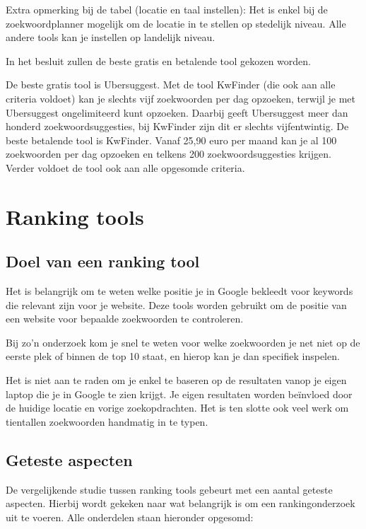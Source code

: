 Extra opmerking bij de tabel (locatie en taal instellen): Het is enkel bij de zoekwoordplanner mogelijk om de locatie in te stellen op stedelijk niveau. Alle andere tools kan je instellen op landelijk niveau. 

In het besluit zullen de beste gratis en betalende tool gekozen worden.

De beste gratis tool is Ubersuggest. Met de tool KwFinder (die ook aan alle criteria voldoet) kan je slechts vijf zoekwoorden per dag opzoeken, terwijl je met Ubersuggest ongelimiteerd kunt opzoeken. Daarbij geeft Ubersuggest meer dan honderd zoekwoordsuggesties, bij KwFinder zijn dit er slechts vijfentwintig. 
De beste betalende tool is KwFinder. Vanaf 25,90 euro per maand kan je al 100 zoekwoorden per dag opzoeken en telkens 200 zoekwoordsuggesties krijgen. Verder voldoet de tool ook aan alle opgesomde criteria. 

\section{Ranking tools}
\label{ch: Ranking tools}

\subsection{Doel van een ranking tool}
\label{ch: Doel van een ranking tool}

Het is belangrijk om te weten welke positie je in Google bekleedt voor keywords die relevant zijn voor je website. Deze tools worden gebruikt om de positie van een website voor bepaalde zoekwoorden te controleren. 

Bij zo’n onderzoek kom je snel te weten voor welke zoekwoorden je net niet op de eerste plek of binnen de top 10 staat, en hierop kan je dan specifiek inspelen.

Het is niet aan te raden om je enkel te baseren op de resultaten vanop je eigen laptop die je in Google te zien krijgt. Je eigen resultaten worden beïnvloed door de huidige locatie en vorige zoekopdrachten. Het is ten slotte ook veel werk om tientallen zoekwoorden handmatig in te typen. 

\subsection{Geteste aspecten}
\label{ch: Geteste aspecten}

De vergelijkende studie tussen ranking tools gebeurt met een aantal geteste aspecten. Hierbij wordt gekeken naar wat belangrijk is om een rankingonderzoek uit te voeren. Alle onderdelen staan hieronder opgesomd: 

